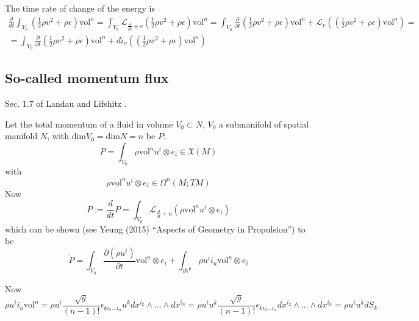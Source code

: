 \documentclass[twoside,landscape,10pt]{amsart}
\theoremstyle{plain}
\theoremstyle{definition}
\theoremstyle{remark}
\theoremstyle{remark}
\begin{document}
\begin{multicols*}{2}
The time rate of change of the energy is 
\[
\begin{gathered}
  \frac{d}{dt} \int_{V_0} ( \frac{1}{2} \rho v^2 + \rho \epsilon )\text{vol}^n = \int_{V_0} \mathcal{L}_{ \frac{\partial}{\partial t} + v } (\frac{1}{2} \rho v^2 + \rho \epsilon )\text{vol}^n = \int_{V_0} \frac{\partial }{\partial t} (\frac{1}{2} \rho v^2 + \rho \epsilon ) \text{vol}^n + \mathcal{L}_v ((\frac{1}{2} \rho v^2 + \rho \epsilon ) \text{vol}^n ) = \\
  = \int_{V_0} \frac{\partial }{\partial t} (\frac{1}{2} \rho v^2 + \rho \epsilon ) \text{vol}^n + di_v ((\frac{1}{2} \rho v^2 + \rho \epsilon ) \text{vol}^n ) 
\end{gathered}
\]

\subsection*{So-called momentum flux}

Sec. 1.7 of Landau and Lifshitz \cite{LLandauELifshitz1987}.  

Let the total momentum of a fluid in volume $V_0 \subset N$, $V_0$ a submanifold of spatial manifold $N$, with $\text{dim}V_0 = \text{dim}N =n$ be $P$:
\[
P = \int_{V_0} \rho \text{vol}^n u^i \otimes e_i \in \mathfrak{X}(M)
\]
with 
\[
\rho \text{vol}^n u^i \otimes e_i \in \Omega^n(M;TM)
\]
Now 
\[
\dot{P} := \frac{d}{dt}P = \int_{V_0} \mathcal{L}_{\frac{ \partial}{\partial t} + u} (\rho \text{vol}^nu^i \otimes e_i)
\]
which can be shown (see Yeung (2015) ``Aspects of Geometry in Propulsion'') to be
\[
\dot{P} = \int_{V_0} \frac{ \partial (\rho u^i)}{ \partial t} \text{vol}^n \otimes e_i + \int_{\partial V^0} \rho u^i i_u \text{vol}^n \otimes e_i
\]

Now
\[
\rho u^i i_u \text{vol}^n = \rho u^i \frac{\sqrt{g}}{(n-1)!} \epsilon_{ki_2\dots i_n} u^k dx^{i_2} \wedge \dots \wedge dx^{i_n} = \rho u^i u^k \frac{\sqrt{g}}{ (n-1)!} \epsilon_{ki_2 \dots i_n} dx^{i_2} \wedge \dots \wedge dx^{i_n} = \rho u^i u^k dS_k
\]


\end{multicols*}
\end{document}
